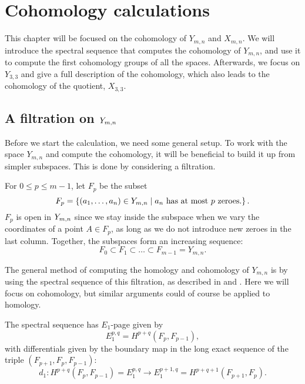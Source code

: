 


\chapter{Cohomology calculations}
\label{chap:udregninger}

This chapter will be focused on the cohomology of $Y_{m,n}$ and
$X_{m,n}$. We will introduce the spectral sequence that computes the
cohomology of $Y_{m,n}$, and use it to compute the first cohomology
groups of all the spaces. Afterwards, we focus on $Y_{3,3}$ and give a
full description of the cohomology, which also leads to the cohomology
of the quotient, $X_{3,3}$.

\section{A filtration on $Y_{m,n}$}
\label{sec:filtration}

Before we start the calculation, we need some general setup. To work
with the space $Y_{m,n}$ and compute the cohomology, it will
be beneficial to build it up from simpler subspaces. This is done by
considering a filtration.

For $0 \leq p \leq m-1$, let $F_p$ be the subset
\[ F_p=\left\{  (a_1,\dots,a_n) \in Y_{m,n} \mid a_n \text{ has at most } p
  \text{ zeroes}. \right\}. \]
$F_p$ is open in $Y_{m,n}$ since we stay inside the subspace when we
vary the coordinates of a point $A\in F_p$, as long as we do not
introduce new zeroes in the last column.
Together, the subspaces form an increasing sequence:
\[ F_0 \subset F_1 \subset \dots \subset F_{m-1} = Y_{m,n}. \]

The general method of computing the homology and cohomology of
$Y_{m,n}$ is by using the spectral sequence of this
filtration, as described in \cite{hatcherss} and
\cite{mccleary}. Here we will focus on
cohomology, but similar arguments could of course be applied to
homology.

The spectral sequence has $E_1$-page given by
\[ E_1^{p,q} = H^{p+q}(F_p,F_{p-1}), \]
with differentials given by the boundary map in the long exact
sequence of the triple $(F_{p+1},F_p,F_{p-1})$:
\[ d_1 : H^{p+q}(F_p,F_{p-1}) = E_1^{p,q} \to E_1^{p+1,q} =
H^{p+q+1}(F_{p+1},F_p). \]

